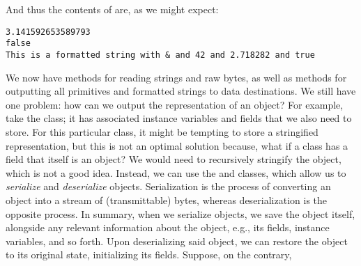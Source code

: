 And thus the contents of  are, as we might expect:

\par{
\begin{verbatim}
3.141592653589793
false
This is a formatted string with & and 42 and 2.718282 and true
\end{verbatim}
}

We now have methods for reading strings and raw bytes, as well as methods for outputting all primitives and formatted strings to data destinations. We still have one problem: how can we output the representation of an object? For example, take the  class; it has associated instance variables and fields that we also need to store. For this particular class, it might be tempting to store a stringified representation, but this is not an optimal solution because, what if a class has a field that itself is an object? We would need to recursively stringify the object, which is not a good idea. Instead, we can use the  and  classes, which allow us to \textit{serialize} and \textit{deserialize} objects. Serialization is the process of converting an object into a stream of (transmittable) bytes, whereas deserialization is the opposite process. In summary, when we serialize objects, we save the object itself, alongside any relevant information about the object, e.g., its fields, instance variables, and so forth. Upon deserializing said object, we can restore the object to its original state, initializing its fields. Suppose, on the contrary,


